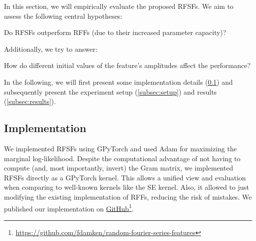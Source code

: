 In this section, we will empirically evaluate the proposed \acp{RFSF}.
We aim to assess the following central hypotheses:
\begin{hypothesis}
	Do \acp{RFSF} outperform \acp{RFF} (due to their increased parameter capacity)?
	\label{hyp:rfsfAreBetter}
\end{hypothesis}
Additionally, we try to answer:
\begin{hypothesis}
	How do different initial values of the feature's amplitudes affect the performance?
	\label{hyp:initialValues}
\end{hypothesis}
In the following, we will first present some implementation details (\cref{subsec:impl}) and subsequently present the experiment setup (\cref{subsec:setup}) and results (\cref{subsec:results}).


\subsection{Implementation}  \label{subsec:impl}
	We implemented \acp{RFSF} using GPyTorch\cite{jacotNeuralTangentKernel2020} and used Adam\cite{kingmaAdamMethodStochastic2017a} for maximizing the marginal log-likelihood.
	Despite the computational advantage of not having to compute (and, most importantly, invert) the Gram matrix, we implemented \acp{RFSF} directly as a GPyTorch kernel.
	This allows a unified view and evaluation when comparing to well-known kernels like the \ac{SE} kernel.
	Also, it allowed to just modifying the existing implementation of \acp{RFF}, reducing the risk of mistakes.
	We published our implementation on \href{https://github.com/fdamken/random-fourier-series-features}{GitHub}\footnote{\url{https://github.com/fdamken/random-fourier-series-features}}.


